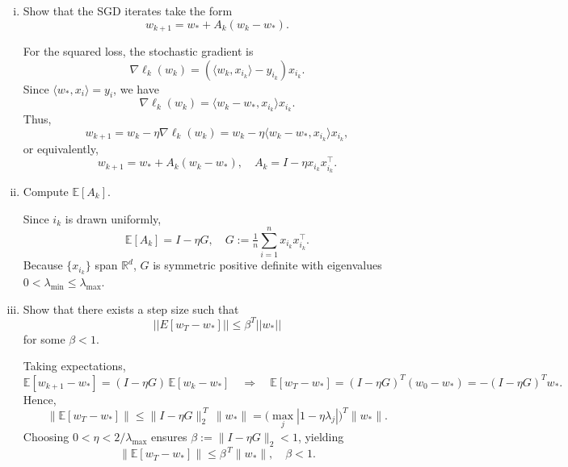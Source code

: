 \documentclass[a4paper]{article}
\begin{document}
\begin{enumerate}[(i)]
    \item Show that the SGD iterates take the form
        $$w_{k+1} = w_* + A_k (w_k - w_* ).$$

For the squared loss, the stochastic gradient is
\[
\nabla \ell_k(w_k) = (\langle w_k, x_{i_k}\rangle - y_{i_k})x_{i_k}.
\]
Since $\langle w_*, x_i\rangle = y_i$, we have
\[
\nabla \ell_k(w_k) = \langle w_k - w_*, x_{i_k}\rangle x_{i_k}.
\]
Thus,
\[
w_{k+1} = w_k - \eta \nabla \ell_k(w_k)
= w_k - \eta \langle w_k - w_*, x_{i_k}\rangle x_{i_k},
\]
or equivalently,
\[
\boxed{w_{k+1} = w_* + A_k (w_k - w_*), \quad A_k = I - \eta x_{i_k}x_{i_k}^\top.}
\]

    \item Compute $\mathbb{E}[A_k]$.

Since $i_k$ is drawn uniformly,
\[
    \boxed{\mathbb{E}[A_k] = I - \eta G, \quad G := \tfrac{1}{n}\sum_{i=1}^n x_{i_k} x_{i_k}^\top.}
\]
Because $\{x_{i_k}\}$ span $\mathbb{R}^d$, $G$ is symmetric positive definite with eigenvalues 
$0<\lambda_{\min}\le\lambda_{\max}$.

    \item Show that there exists a step size such that
        $$|| E[w_T - w_* ]|| \leq \beta^T ||w_*||$$
for some $\beta < 1$.

Taking expectations,
\[
\mathbb{E}[w_{k+1}-w_*] = (I - \eta G)\,\mathbb{E}[w_k-w_*]
\quad\Rightarrow\quad
\mathbb{E}[w_T-w_*] = (I - \eta G)^T (w_0 - w_*) = -(I - \eta G)^T w_*.
\]
Hence,
\[
\|\mathbb{E}[w_T - w_*]\|
\le \|I - \eta G\|_2^{\,T}\,\|w_*\|
= \big(\max_j |1 - \eta \lambda_j|\big)^{\!T}\|w_*\|.
\]
Choosing $0 < \eta < 2/\lambda_{\max}$ ensures $\beta := \|I - \eta G\|_2 < 1$, yielding
\[
\boxed{\;\|\mathbb{E}[w_T - w_*]\| \le \beta^{\,T}\|w_*\|,\quad \beta < 1.\;}
\]

\end{enumerate}
\end{document}
